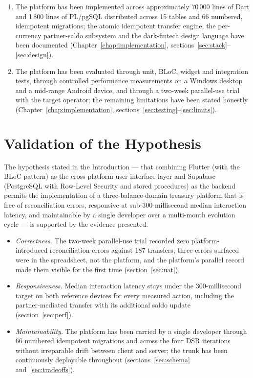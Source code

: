 \begin{enumerate}[leftmargin=1.2cm]
  \item The platform has been implemented across approximately 70\,000 lines of Dart and 1\,800 lines of PL/pgSQL distributed across 15 tables and 66 numbered, idempotent migrations; the atomic idempotent transfer engine, the per-currency partner-saldo subsystem and the dark-fintech design language have been documented (Chapter~\ref{chap:implementation}, sections~\ref{sec:stack}--\ref{sec:design}).
  \item The platform has been evaluated through unit, BLoC, widget and integration tests, through controlled performance measurements on a Windows desktop and a mid-range Android device, and through a two-week parallel-use trial with the target operator; the remaining limitations have been stated honestly (Chapter~\ref{chap:implementation}, sections~\ref{sec:testing}--\ref{sec:limits}).
\end{enumerate}

\section*{Validation of the Hypothesis}
The hypothesis stated in the Introduction --- that combining Flutter (with the BLoC pattern) as the cross-platform user-interface layer and Supabase (PostgreSQL with Row-Level Security and stored procedures) as the backend permits the implementation of a three-balance-domain treasury platform that is free of reconciliation errors, responsive at sub-300-millisecond median interaction latency, and maintainable by a single developer over a multi-month evolution cycle --- is supported by the evidence presented.

\begin{itemize}[leftmargin=1.2cm]
  \item \emph{Correctness.} The two-week parallel-use trial recorded zero platform-introduced reconciliation errors against 187 transfers; three errors surfaced were in the spreadsheet, not the platform, and the platform's parallel record made them visible for the first time (section~\ref{sec:uat}).
  \item \emph{Responsiveness.} Median interaction latency stays under the 300-millisecond target on both reference devices for every measured action, including the partner-mediated transfer with its additional saldo update (section~\ref{sec:perf}).
  \item \emph{Maintainability.} The platform has been carried by a single developer through 66 numbered idempotent migrations and across the four DSR iterations without irreparable drift between client and server; the trunk has been continuously deployable throughout (sections~\ref{sec:schema} and~\ref{sec:tradeoffs}).
\end{itemize}

